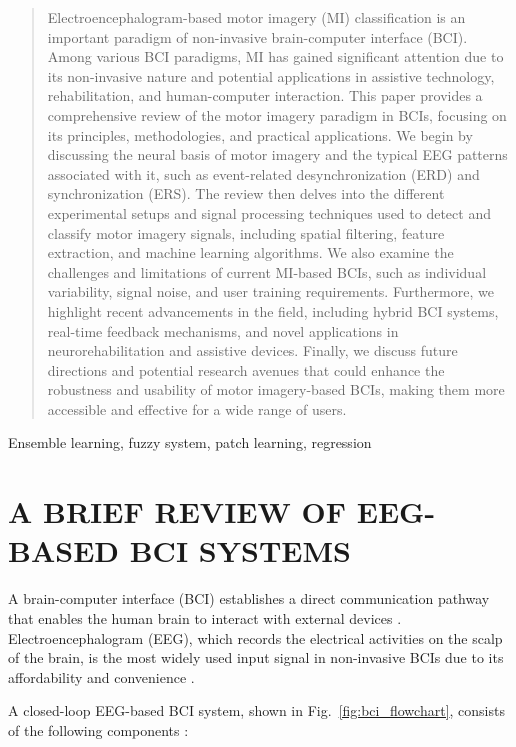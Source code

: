 \documentclass[journal,twocolumn]{IEEEtran}
\begin{document}
\begin{abstract}
Electroencephalogram-based motor imagery (MI) classification is an important paradigm of non-invasive brain-computer interface (BCI). Among various BCI paradigms, MI has gained significant attention due to its non-invasive nature and potential applications in assistive technology, rehabilitation, and human-computer interaction. This paper provides a comprehensive review of the motor imagery paradigm in BCIs, focusing on its principles, methodologies, and practical applications. We begin by discussing the neural basis of motor imagery and the typical EEG patterns associated with it, such as event-related desynchronization (ERD) and synchronization (ERS). The review then delves into the different experimental setups and signal processing techniques used to detect and classify motor imagery signals, including spatial filtering, feature extraction, and machine learning algorithms. We also examine the challenges and limitations of current MI-based BCIs, such as individual variability, signal noise, and user training requirements. Furthermore, we highlight recent advancements in the field, including hybrid BCI systems, real-time feedback mechanisms, and novel applications in neurorehabilitation and assistive devices. Finally, we discuss future directions and potential research avenues that could enhance the robustness and usability of motor imagery-based BCIs, making them more accessible and effective for a wide range of users.
\end{abstract}

\begin{IEEEkeywords}
Ensemble learning, fuzzy system, patch learning, regression
\end{IEEEkeywords}

\IEEEpeerreviewmaketitle

\section{A BRIEF REVIEW OF EEG-BASED BCI SYSTEMS}

A brain-computer interface (BCI) establishes a direct communication pathway that enables the human brain to interact with external devices \cite{graimann2010brain}. Electroencephalogram (EEG), which records the electrical activities on the scalp of the brain, is the most widely used input signal in non-invasive BCIs due to its affordability and convenience \cite{nicolas2012brain}.

A closed-loop EEG-based BCI system, shown in Fig.~\ref{fig:bci_flowchart}, consists of the following components \cite{wu2020transfer}:
\end{document}
